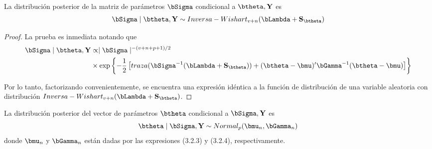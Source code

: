 \begin{Res}
La distribución posterior de la matriz de parámetros $\bSigma$ condicional a $\btheta,\mathbf{Y}$ es
\begin{equation*}\label{Pos_Cond_bSigma}
\bSigma \mid \btheta,\mathbf{Y} \sim Inversa-Wishart_{v+n}(\bLambda+\mathbf{S}_{\btheta})
\end{equation*}
\end{Res}

\begin{proof}
La prueba es inmediata notando que
\begin{align*}
\bSigma \mid \btheta,\mathbf{Y}&\propto\mid \bSigma \mid ^{-(v+n+p+1)/2}\notag\\
&\times\exp\left\{ -\frac{1}{2}\left[traza(\bSigma^{-1}(\bLambda+\mathbf{S}_{\btheta}))+(\btheta-\bmu)'\bGamma^{-1}(\btheta-\bmu)\right]\right\}
\end{align*}

Por lo tanto, factorizando convenientemente, se encuentra una expresión idéntica a la función de distribución de una variable aleatoria con distribución $Inversa-Wishart_{v+n}(\bLambda+\mathbf{S}_{\btheta})$.
\end{proof}
                          
\begin{Res}
La distribución posterior del vector de parámetros $\btheta$ condicional a $\bSigma,\mathbf{Y}$ es
\begin{equation}\label{Pos_Cond_btheta}
\btheta \mid  \bSigma,\mathbf{Y} \sim Normal_p(\bmu_n,\bGamma_n)
\end{equation}
donde $\bmu_n$ y $\bGamma_n$ están dadas por las expresiones (3.2.3) y (3.2.4), respectivamente.
\end{Res}
                              
